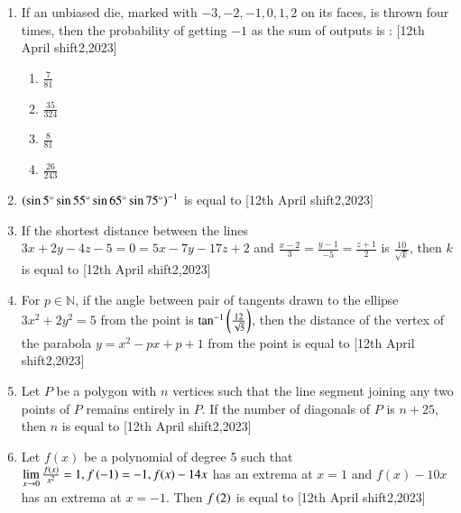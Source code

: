 \documentclass[journal]{IEEEtran}
\begin{document}
\begin{enumerate}[start=16]
\item If an unbiased die, marked with $-3,-2,-1,0,1,2$ on its faces, is thrown four times, then the probability of getting $-1$ as the sum of outputs is : \hfill{[12th April shift2,2023]}
\begin{enumerate}
    \item $\frac{7}{81}$
    \item $\frac{35}{324}$
    \item $\frac{8}{81}$
    \item $\frac{26}{243}$
\end{enumerate}

\item $\left( \sin 5^\circ \sin 55^\circ \sin 65^\circ \sin 75^\circ\right)^{-1}$ is equal to \underline{\hspace{1cm}} \hfill{[12th April shift2,2023]}\\

\item If the shortest distance between the lines \\
$3x+2y-4z-5=0=5x-7y-17z+2$ and $\frac{x-2}{3}=\frac{y-1}{-5}=\frac{z+1}{2}$ is $\frac{10}{\sqrt{k}}$, then $k$ is equal to \underline{\hspace{1cm}} \hfill{[12th April shift2,2023]}\\

\item For $p \in \mathbb N$, if the angle between pair of tangents drawn to the ellipse $3x^{2}+2y^{2}=5$ from the point  is $\tan^{-1}\left(\frac{12}{\sqrt{5}}\right)$, then the distance of the vertex of the parabola $y=x^2-px+p+1$ from the point  is equal to \underline{\hspace{1cm}} \hfill{[12th April shift2,2023]}\\

\item Let $P$ be a polygon with $n$ vertices such that the line segment joining any two points of $P$ remains entirely in $P$. If the number of diagonals of $P$ is $n+25$, then $n$ is equal to \underline{\hspace{1cm}} \hfill{[12th April shift2,2023]}\\

\item Let $f(x)$ be a polynomial of degree 5 such that $\lim\limits_{x\to 0}\frac{f(x)}{x^2}=1, f\left(-1\right)=-1, f(x)-14x$ has an extrema at $x=1$ and $f(x)-10x$ has an extrema at $x=-1$. Then $f\left(2\right)$ is equal to \underline{\hspace{1cm}} \hfill{[12th April shift2,2023]}\\


\end{enumerate}
\end{document}
